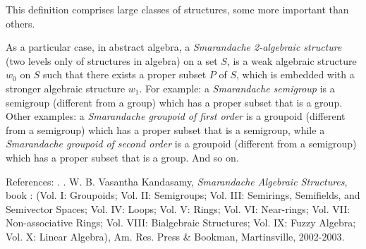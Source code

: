 \documentclass[12pt]{article}
\begin{document}
This definition comprises large classes of structures, some more important than others.

As a particular case, in abstract algebra, a \emph{Smarandache 2-algebraic structure} (two levels only of structures in algebra) on a set $S$, is a weak algebraic structure $w_0$ on $S$ such that there exists a proper subset $P$ of $S$, which is embedded with a stronger algebraic structure $w_1$.
\newline For example: a \emph{Smarandache semigroup} is a semigroup (different from a group) which has a proper subset that is a group.
\newline Other examples: a \emph{Smarandache groupoid of first order} is a groupoid (different from a semigroup) which has a proper subset that is a semigroup, while a \emph{Smarandache groupoid of second order} is a groupoid (different from a semigroup) which has a proper subset that is a group.  And so on.

References:
. 
. W. B. Vasantha Kandasamy, \emph{Smarandache Algebraic Structures}, book :    (Vol. I: Groupoids;  Vol. II: Semigroups;  Vol. III: Semirings, Semifields, and Semivector Spaces;  Vol. IV: Loops; Vol. V: Rings; Vol. VI: Near-rings; Vol. VII: Non-associative Rings; Vol. VIII: Bialgebraic Structures; Vol. IX: Fuzzy Algebra; Vol. X: Linear Algebra), Am. Res. Press \& Bookman, Martinsville, 2002-2003.
\end{document}
